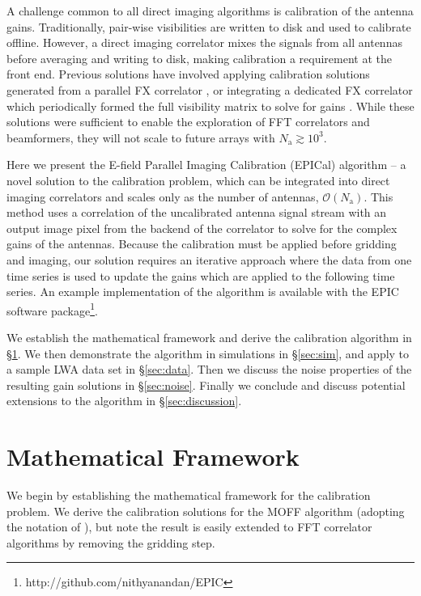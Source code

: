 \documentclass[a4paper,fleqn,usenatbib]{../mnras}
\newcommand{\Nant}{\ensuremath{N_{\mathrm{a}}}}
\begin{document}
A challenge common to all direct imaging algorithms is calibration of the antenna gains. Traditionally, pair-wise visibilities are written to disk and used to calibrate offline. However, a direct imaging correlator mixes the signals from all antennas before averaging and writing to disk, making calibration a requirement at the front end. Previous solutions have involved applying calibration solutions generated from a parallel FX correlator \citep{zhe14, fos14}, or integrating a dedicated FX correlator which periodically formed the full visibility matrix to solve for gains \citep{wij09,dev09}. While these solutions were sufficient to enable the exploration of FFT correlators and beamformers, they will not scale to future arrays with $\Nant \gtrsim 10^3$.

Here we present the E-field Parallel Imaging Calibration (EPICal) algorithm -- a novel solution to the calibration problem, which can be integrated into direct imaging correlators and scales only as the number of antennas, $\mathcal{O}(\Nant)$. This method uses a correlation of the uncalibrated antenna signal stream with an output image pixel from the backend of the correlator to solve for the complex gains of the antennas. Because the calibration must be applied before gridding and imaging, our solution requires an iterative approach where the data from one time series is used to update the gains which are applied to the following time series. An example implementation of the algorithm is available with the EPIC software package\footnote{http://github.com/nithyanandan/EPIC}.

We establish the mathematical framework and derive the calibration algorithm in \S \ref{sec:math}. We then demonstrate the algorithm in simulations in \S \ref{sec:sim}, and apply to a sample LWA data set in \S \ref{sec:data}. Then we discuss the noise properties of the resulting gain solutions in \S \ref{sec:noise}. Finally we conclude and discuss potential extensions to the algorithm in \S \ref{sec:discussion}.

\section{Mathematical Framework}\label{sec:math}
We begin by establishing the mathematical framework for the calibration problem. We derive the calibration solutions for the MOFF algorithm (adopting the notation of \citealt{thy15c}), but note the result is easily extended to FFT correlator algorithms by removing the gridding step.
\end{document}
